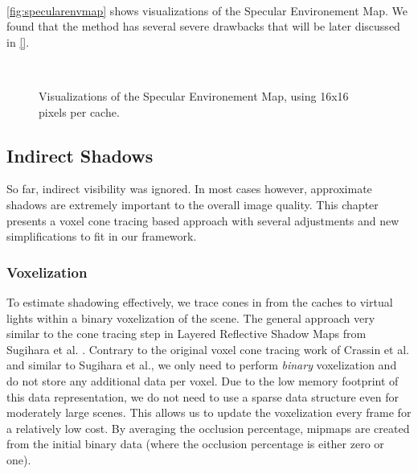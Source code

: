 \documentclass[thesis.tex]{subfiles}
\begin{document}
\\
\autoref{fig:specularenvmap} shows visualizations of the Specular Environement Map.
We found that the method has several severe drawbacks that will be later discussed in \autoref{}. 
\begin{figure}[h!]
\centering
{}
\\
\caption{Visualizations of the Specular Environement Map, using 16x16 pixels per cache.}
\label{fig:specularenvmap}
\end{figure}

\subsection{Indirect Shadows}
So far, indirect visibility was ignored.
In most cases however, approximate shadows are extremely important to the overall image quality. 
This chapter presents a voxel cone tracing based approach with several adjustments and new simplifications to fit in our framework.

\subsubsection{Voxelization}\label{sec:impl:voxelization}
To estimate shadowing effectively, we trace cones in from the caches to virtual lights within a binary voxelization of the scene.
The general approach very similar to the cone tracing step in \cite{bib:layeredrsm} Layered Reflective Shadow Maps from Sugihara et al. \cite{bib:layeredrsm}.
Contrary to the original voxel cone tracing work of Crassin et al. \cite{bib:voxelconetracing} and similar to Sugihara et al., we only need to perform \emph{binary} voxelization and do not store any additional data per voxel.
Due to the low memory footprint of this data representation, we do not need to use a sparse data structure even for moderately large scenes.
This allows us to update the voxelization every frame for a relatively low cost.
By averaging the occlusion percentage, mipmaps are created from the initial binary data (where the occlusion percentage is either zero or one).
\end{document}
